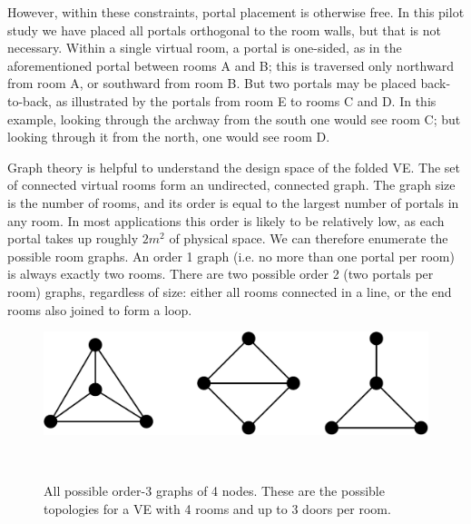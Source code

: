 \documentclass{sigchi}
\begin{document}
However, within these constraints, portal placement is otherwise free.  In this pilot study we have placed all portals orthogonal to the room walls, but that is not necessary.  Within a single virtual room, a portal is one-sided, as in the aforementioned portal between rooms A and B; this is traversed only northward from room A, or southward from room B.  But two portals may be placed back-to-back, as illustrated by the portals from room E to rooms C and D.  In this example, looking through the archway from the south one would see room C; but looking through it from the north, one would see room D.

Graph theory is helpful to understand the design space of the folded VE.  The set of connected virtual rooms form an undirected, connected graph.  The graph size is the number of rooms, and its order is equal to the largest number of portals in any room.  In most applications this order is likely to be relatively low, as each portal takes up roughly $2 m^2$ of physical space.  We can therefore enumerate the possible room graphs.  An order 1 graph (i.e. no more than one portal per room) is always exactly two rooms.  There are two possible order 2 (two portals per room) graphs, regardless of size: either all rooms connected in a line, or the end rooms also joined to form a loop.

\begin{figure}[htb]
  \centering
  \includegraphics[width=1\columnwidth]{figures/Size4Graphs.pdf}
  \caption{All possible order-3 graphs of 4 nodes.  These are the possible topologies for a VE with 4 rooms and up to 3 doors per room.}~\label{fig:size4Graphs}
\end{figure}
\end{document}
